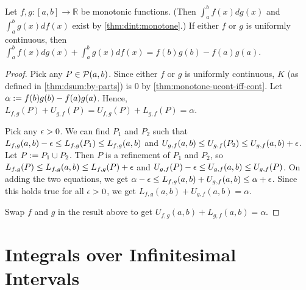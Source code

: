 \documentclass[a4paper,12pt,fleqn]{article}
\begin{document}
\begin{lemma}
\label{thm:dint:by-parts}
Let $f, g: [a, b] \to \mathbb{R}$ be monotonic functions.
(Then $\int_a^b f(x)dg(x)$ and $\int_a^b g(x)df(x)$ exist by \cref{thm:dint:monotone}.)
If either $f$ or $g$ is uniformly continuous, then
$\int_a^b f(x)dg(x) + \int_a^b g(x)df(x) = f(b)g(b) - f(a)g(a)$.
\end{lemma}
\begin{proof}
Pick any $P \in \mathcal{P}(a, b)$.
Since either $f$ or $g$ is uniformly continuous,
$K$ (as defined in \cref{thm:dsum:by-parts})
is 0 by \cref{thm:monotone-ucont-iff-cont}.
Let $\alpha := f(b)g(b)-f(a)g(a)$.
Hence, $L_{f,g}(P) + U_{g,f}(P) = U_{f,g}(P) + L_{g,f}(P) = \alpha$.

Pick any $\epsilon > 0$. We can find $P_1$ and $P_2$ such that
$L_{f,g}(a, b) - \epsilon \le L_{f,g}(P_1) \le L_{f,g}(a, b)$
and $U_{g,f}(a, b) \le U_{g,f}(P_2) \le U_{g,f}(a, b) + \epsilon$.
Let $P := P_1 \cup P_2$. Then $P$ is a refinement of $P_1$ and $P_2$,
so $L_{f,g}(P) \le L_{f,g}(a, b) \le L_{f,g}(P) + \epsilon$
and $U_{g,f}(P) - \epsilon \le U_{g,f}(a, b) \le U_{g,f}(P)$.
On adding the two equations, we get
$\alpha - \epsilon \le L_{f,g}(a, b) + U_{g,f}(a, b) \le \alpha + \epsilon$.
Since this holds true for all $\epsilon > 0$,
we get $L_{f,g}(a, b) + U_{g,f}(a, b) = \alpha$.

Swap $f$ and $g$ in the result above to get
$U_{f,g}(a, b) + L_{g,f}(a, b) = \alpha$.
\end{proof}

\section{Integrals over Infinitesimal Intervals}
\end{document}
